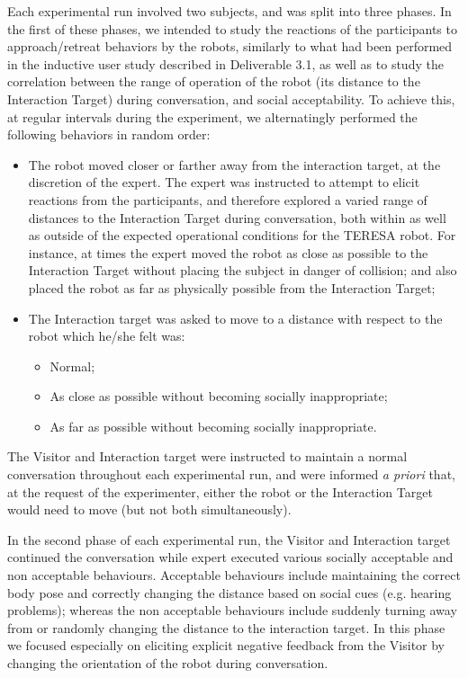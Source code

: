 \documentclass[a4paper,11pt]{report}
\begin{document}
Each experimental run involved two subjects, and was split into three phases. In the first of these phases, we intended to study the reactions of the participants to approach/retreat behaviors by the robots, similarly to what had been performed in the inductive user study described in Deliverable 3.1, as well as to study the correlation between the range of operation of the robot (its distance to the Interaction Target) during conversation, and social acceptability. To achieve this, at regular intervals during the experiment, we alternatingly performed the following behaviors in random order:
\begin{itemize}
\item The robot moved closer or farther away from the interaction target, at the discretion of the expert. The expert was instructed to attempt to elicit reactions from the participants, and therefore explored a varied range of distances to the Interaction Target during conversation, both within as well as outside of the expected operational conditions for the TERESA robot. For instance, at times the expert moved the robot as close as possible to the Interaction Target without placing the subject in danger of collision; and also placed the robot as far as physically possible from the Interaction Target;
\item The Interaction target was asked to move to a distance with respect to the robot which he/she felt was:
  \begin{itemize}
  \item Normal;
  \item As close as possible without becoming socially inappropriate;
  \item As far as possible without becoming socially inappropriate.
  \end{itemize}
\end{itemize}

The Visitor and Interaction target were instructed to maintain a normal conversation throughout each experimental run, and were informed \emph{a priori} that, at the request of the experimenter, either the robot or the Interaction Target would need to move (but not both simultaneously).

In the second phase of each experimental run, the Visitor and Interaction target continued the conversation while expert executed various socially acceptable and non acceptable behaviours. Acceptable behaviours include maintaining the correct body pose and correctly changing the distance based on social cues (e.g. hearing problems); whereas the non acceptable behaviours include suddenly turning away from or randomly changing the distance to the interaction target. In this phase we focused especially on eliciting explicit negative feedback from the Visitor by changing the orientation of the robot during conversation.
\end{document}
